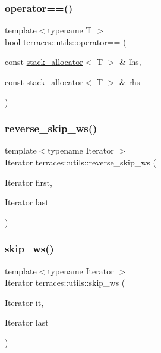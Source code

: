 \subsubsection{\texorpdfstring{operator==()}{operator==()}}
{\footnotesize\ttfamily template$<$typename T $>$ \\
bool terraces\+::utils\+::operator== (\begin{DoxyParamCaption}\item[{const \hyperlink{classterraces_1_1utils_1_1stack__allocator}{stack\+\_\+allocator}$<$ T $>$ \&}]{lhs,  }\item[{const \hyperlink{classterraces_1_1utils_1_1stack__allocator}{stack\+\_\+allocator}$<$ T $>$ \&}]{rhs }\end{DoxyParamCaption})}

\mbox{\label{namespaceterraces_1_1utils_a8f537b0f3154a2a1c21650098e16797e}} 
\subsubsection{\texorpdfstring{reverse\+\_\+skip\+\_\+ws()}{reverse\_skip\_ws()}}
{\footnotesize\ttfamily template$<$typename Iterator $>$ \\
Iterator terraces\+::utils\+::reverse\+\_\+skip\+\_\+ws (\begin{DoxyParamCaption}\item[{Iterator}]{first,  }\item[{Iterator}]{last }\end{DoxyParamCaption})}

\mbox{\label{namespaceterraces_1_1utils_a72c9d3a03a496794590f5c9d7a01aa58}} 
\subsubsection{\texorpdfstring{skip\+\_\+ws()}{skip\_ws()}}
{\footnotesize\ttfamily template$<$typename Iterator $>$ \\
Iterator terraces\+::utils\+::skip\+\_\+ws (\begin{DoxyParamCaption}\item[{Iterator}]{it,  }\item[{Iterator}]{last }\end{DoxyParamCaption})}

